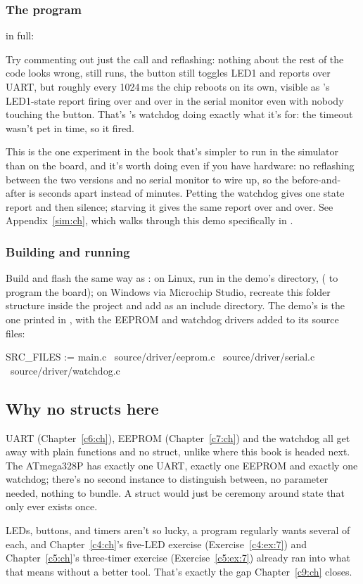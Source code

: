 \subsubsection{The program}
 in full:


\noindent Try commenting out just the  call and reflashing: nothing about
the rest of the code looks wrong,  still runs, the button still toggles LED1 and
reports over UART, but roughly every 1024\,ms the chip reboots on its own, visible as
's LED1-state report firing over and over in the serial monitor even with nobody
touching the button. That's 's watchdog doing exactly what it's for: the timeout
wasn't pet in time, so it fired.

This is the one experiment in the book that's simpler to run in the simulator than on the board,
and it's worth doing even if you have hardware: no reflashing between the two versions and no
serial monitor to wire up, so the before-and-after is seconds apart instead of minutes. Petting the
watchdog gives one state report and then silence; starving it gives the same report over and over.
See Appendix~\ref{sim:ch}, which walks through this demo specifically in
.

\subsubsection{Building and running}
Build and flash the same way as : on Linux, run  in the demo's
directory,  ( to program the board); on
Windows via Microchip Studio, recreate this folder structure inside the project and add
 as an include directory. The demo's  is the one printed in
, with the EEPROM and watchdog drivers added to its source files:

\begin{makecode}
SRC_FILES := main.c \
             source/driver/eeprom.c \
             source/driver/serial.c \
             source/driver/watchdog.c \
\end{makecode}

\subsection{Why no structs here}
\label{c8:a:6}
UART (Chapter~\ref{c6:ch}), EEPROM (Chapter~\ref{c7:ch}) and the watchdog all get away with plain
functions and no struct, unlike where this book is headed next. The ATmega328P has exactly one
UART, exactly one EEPROM and exactly one watchdog; there's no second instance to distinguish
between, no  parameter needed, nothing to bundle. A struct would just be ceremony around
state that only ever exists once.

LEDs, buttons, and timers aren't so lucky, a program regularly wants several of each, and
Chapter~\ref{c4:ch}'s five-LED exercise (Exercise~\ref{c4:ex:7}) and Chapter~\ref{c5:ch}'s
three-timer exercise (Exercise~\ref{c5:ex:7}) already ran into what that means without a better
tool. That's exactly the gap Chapter~\ref{c9:ch} closes.
